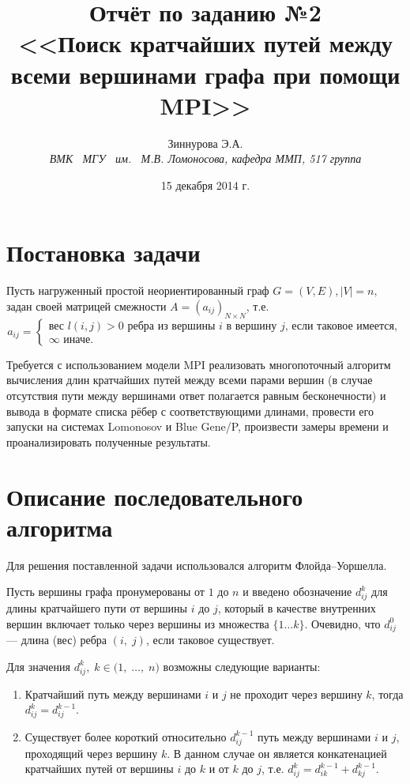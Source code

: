 \documentclass[a4paper,12pt]{report}
\begin{document}
\title{Отчёт по заданию №2 \\ <<Поиск кратчайших путей между всеми вершинами графа при помощи MPI>>}
\author{Зиннурова Э.А. \\ \textit{ВМК \, МГУ \, им. \, М.В. Ломоносова, кафедра ММП, 517 группа}}
\date{15 декабря 2014 г.}

\maketitle

\section*{Постановка задачи}
	\par Пусть нагруженный простой неориентированный граф $G=(V, E), |V| = n,$ задан своей матрицей смежности $A = (a_{ij})_{N \times N}$, т.е. 
	$$a_{ij} = \begin{cases}
		\text{вес $l(i,j) > 0$ ребра из вершины $i$ в вершину $j$, если таковое имеется},\\
		\infty \text{ иначе}.
		\end{cases}
$$
	\par Требуется с использованием модели MPI реализовать многопоточный алгоритм вычисления длин кратчайших путей между всеми парами вершин (в случае отсутствия пути между вершинами ответ полагается равным бесконечности) и вывода в формате списка рёбер с соответствующими длинами, провести его запуски на системах Lomonosov и Blue Gene/P, произвести замеры времени и проанализировать полученные результаты.
	
\section*{Описание последовательного алгоритма}
	\par Для решения поставленной задачи использовался алгоритм Флойда--Уоршелла.
	\par Пусть вершины графа пронумерованы от $1$ до $n$ и введено обозначение $d_{i j}^{k}$ для длины кратчайшего пути от вершины $i$ до $j$, который в качестве внутренних вершин включает только через вершины из множества $\{1 \ldots k\}$. Очевидно, что $d_{i j}^{0}$ — длина (вес) ребра $(i,\;j)$, если таковое существует.
	\par Для значения $d_{i j}^{k},\;k \in \mathbb (1,\;\ldots,\;n)$ возможны следующие варианты:
	\begin{enumerate}
	\item
	Кратчайший путь между вершинами $i$ и $j$ не проходит через вершину $k$, тогда $d_{i j}^{k}=d_{i j}^{k-1}$.
	\item
	Существует более короткий относительно $d_{ij}^{k-1}$ путь между вершинами $i$ и $j$, проходящий через вершину $k$. В данном случае он является конкатенацией кратчайших путей от вершины $i$ до $k$ и от $k$ до $j$, т.е. $d_{i j}^{k}=d_{i k}^{k-1} + d_{k j}^{k-1}.$
	\end{enumerate}
\end{document}
